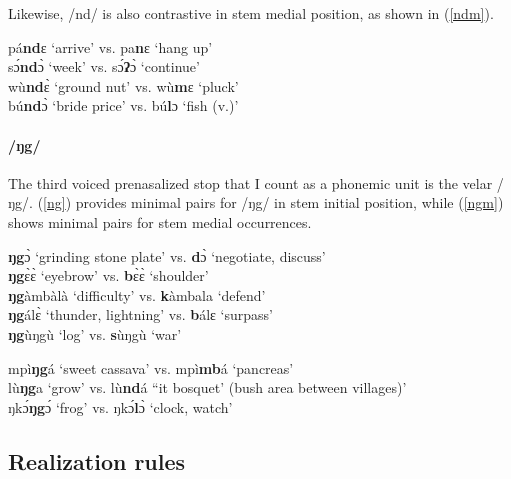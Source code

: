 \noindent Likewise, /nd/ is also contrastive in stem medial position, as shown in (\ref{ndm}).

\begin{exe} \ex \label{ndm}
pá{\bfseries nd}ɛ `arrive' vs. pa{\bfseries n}ɛ `hang up' \\
sɔ́{\bfseries nd}ɔ̀ `week' vs. sɔ́{\bfseries ʔ}ɔ̀ `continue' \\
wù{\bfseries nd}ɛ̀ `ground nut' vs. wù{\bfseries m}ɛ `pluck' \\
bú{\bfseries nd}ɔ̀ `bride price' vs. bú{\bfseries l}ɔ `fish (v.)' 
\end{exe}


\paragraph{\bfseries /ŋg/}     The third voiced prenasalized stop that I count as a phonemic unit is the velar /ŋg/. (\ref{ng}) provides minimal pairs for /ŋg/ in stem initial position, while (\ref{ngm}) shows minimal pairs for stem medial occurrences.


\begin{exe} \ex \label{ng}
{\bfseries ŋg}ɔ̀ `grinding stone plate' vs. {\bfseries d}ɔ̀ `negotiate, discuss' \\
{\bfseries ŋg}ɛ̀ɛ̀ `eyebrow' vs. {\bfseries b}ɛ̀ɛ̀ `shoulder' \\ %
{\bfseries ŋg}àmbàlà `difficulty' vs. {\bfseries k}àmbala `defend' \\
{\bfseries ŋg}álɛ̀ `thunder, lightning' vs. {\bfseries b}álɛ `surpass' \\
{\bfseries ŋg}ùŋgù `log' vs. {\bfseries s}ùŋgù `war'
\end{exe}

\begin{exe} \ex \label{ngm}
mpì{\bfseries ŋg}á `sweet cassava' vs. mpì{\bfseries mb}á `pancreas' \\
lù{\bfseries ŋg}a `grow' vs. lù{\bfseries nd}á ``{it bosquet}' (bush area between villages)' \\
ŋkɔ́{\bfseries ŋg}ɔ́ `frog' vs. ŋkɔ́{\bfseries l}ɔ̀ `clock, watch' \\
\end{exe}



\subsection{Realization rules}
\label{sec:Realization}

